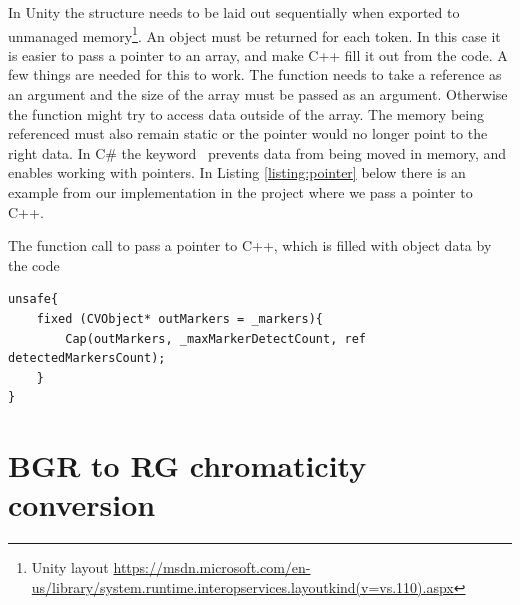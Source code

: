 In Unity the structure needs to be laid out sequentially when exported to unmanaged memory\footnote{Unity layout \url{https://msdn.microsoft.com/en-us/library/system.runtime.interopservices.layoutkind(v=vs.110).aspx}}.  An object must be returned for each token. In this case it is easier to pass a pointer to an array, and make C++ fill it out from the code. A few things are needed for this to work. The function needs to take a reference as an argument and the size of the array must be passed as an argument. Otherwise the function might try to access data outside of the array. The memory being referenced must also remain static or the pointer would no longer point to the right data. In C\# the keyword  prevents data from being moved in memory, and  enables working with pointers. In Listing \ref{listing:pointer} below there is an example from our implementation in the project where we pass a pointer to C++. %
\begin{listing}[H]
\caption{The function call to pass a pointer to C++, which is filled with object data by the code}
\label{listing:pointer}
\begin{verbatim}
unsafe{
	fixed (CVObject* outMarkers = _markers){
		Cap(outMarkers, _maxMarkerDetectCount, ref detectedMarkersCount);
	}
}
\end{verbatim}
\end{listing}


\section{BGR to RG chromaticity conversion}

